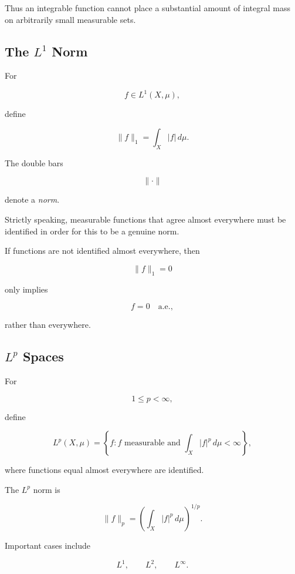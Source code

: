 Thus an integrable function cannot place a substantial amount of integral
mass on arbitrarily small measurable sets.

\subsection{The \(L^1\) Norm}
\label{subsec:l1-norm}

For

\[
f\in L^1(X,\mu),
\]

define

\[
\boxed{
\|f\|_1
=
\int_X|f|\,d\mu.
}
\]

The double bars

\[
\|\cdot\|
\]

denote a \emph{norm}.

Strictly speaking, measurable functions that agree almost everywhere must
be identified in order for this to be a genuine norm.

If functions are not identified almost everywhere, then

\[
\|f\|_1=0
\]

only implies

\[
f=0
\quad\text{a.e.},
\]

rather than everywhere.

\subsection{\(L^p\) Spaces}
\label{subsec:lp-spaces-introduction}

For

\[
1\leq p<\infty,
\]

define

\[
\boxed{
L^p(X,\mu)
=
\left\{
f:
f\text{ measurable and }
\int_X|f|^p\,d\mu<\infty
\right\},
}
\]

where functions equal almost everywhere are identified.

The \(L^p\) norm is

\[
\boxed{
\|f\|_p
=
\left(
\int_X|f|^p\,d\mu
\right)^{1/p}.
}
\]

Important cases include

\[
\boxed{
L^1,
\qquad
L^2,
\qquad
L^\infty.
}
\]

